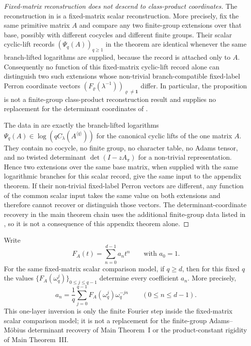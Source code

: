\begin{proof}[Fixed-matrix reconstruction does not descend to class-product coordinates]
  The reconstruction in
   is a
  fixed-matrix scalar reconstruction.  More precisely, fix the same primitive
  matrix \(A\) and compare any two finite-group extensions over that base,
  possibly with different cocycles and different finite groups.  Their scalar
  cyclic-lift records \((\Psi_q(A))_{q\ge1}\) in the theorem are identical
  whenever the same branch-lifted logarithms are supplied, because the record
  is attached only to \(A\).  Consequently no function of this fixed-matrix
  cyclic-lift record alone can distinguish two such extensions whose
  non-trivial branch-compatible fixed-label Perron coordinate vectors
  \((F_\varrho(\lambda^{-1}))_{\varrho\ne\mathbf1}\) differ.  In particular,
  the proposition is not a finite-group class-product reconstruction result and
  supplies no replacement for the determinant coordinates of
  .

  The data in  are
  exactly the branch-lifted logarithms
  \(\Psi_q(A)\in\log(qC_\lambda(A^{\langle q\rangle}))\) for the canonical
  cyclic lifts of the one matrix \(A\).  They contain no cocycle, no finite
  group, no character table, no Adams tensor, and no twisted determinant
  \(\det(I-zA_\pi)\) for a non-trivial representation.  Hence two extensions
  over the same base matrix, when supplied with the same logarithmic branches
  for this scalar record, give the same input to the appendix theorem.  If
  their non-trivial fixed-label Perron vectors are different, any function of
  the common scalar input takes the same value on both extensions and therefore
  cannot recover or distinguish those vectors.  The determinant-coordinate
  recovery in the main theorem chain uses the additional finite-group data
  listed in , so it is not a
  consequence of this appendix theorem alone.
\end{proof}

\begin{proposition}
  \label{thm:finite-part-cyclic-lift-single-q-torsion-reconstruction}
  \label{thm:appendix-one-layer-reconstruction}
  \label{cor:intro-one-layer-reconstruction}
  Write
  \[
    F_A(t)=\sum_{n=0}^{d-1}a_n t^n
    \qquad\text{with } a_0=1.
  \]
  For the same fixed-matrix scalar comparison model, if \(q\ge d\), then
  for this fixed \(q\) the values
  \(\{F_A(\omega_q^j)\}_{0\le j\le q-1}\) determine every coefficient
  \(a_n\). More precisely,
  \[
    a_n=\frac{1}{q}\sum_{j=0}^{q-1}
      F_A(\omega_q^j)\omega_q^{-jn}
    \qquad (0\le n\le d-1).
  \]
  This one-layer inversion is only the finite Fourier step inside the
  fixed-matrix scalar comparison model; it is not a replacement for the
  finite-group Adams--M\"obius determinant recovery of Main Theorem~I or the
  product-constant rigidity of Main Theorem~III.
\end{proposition}

